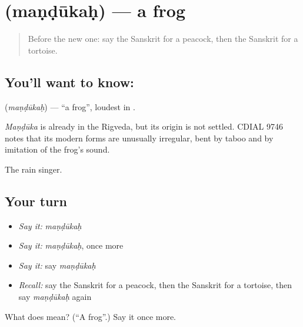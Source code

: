 \section[\texorpdfstring{\sk{मण्डूकः} (maṇḍūkaḥ)}{मण्डूकः (maṇḍūkaḥ)}]{ (maṇḍūkaḥ) — a frog}

\label{lesson:SA-C80-frog}



\begin{quote}
Before the new one: say the Sanskrit for a peacock, then the Sanskrit for a tortoise.
\end{quote}

\subsection*{You'll want to know: }
\textbf{} (\emph{maṇḍūkaḥ}) — \textquotedblleft{}a frog\textquotedblright{}, loudest in \textbf{}.

\begin{cousinweb}
\emph{Maṇḍūka} is already in the Rigveda, but its origin is not settled. CDIAL 9746 notes that its modern forms are unusually irregular, bent by taboo and by imitation of the frog's sound.
\end{cousinweb}

\begin{grammarlens}[title={What you've built}]
The rain singer.
\end{grammarlens}

\subsection*{Your turn}
\begin{itemize}
\raggedright
  \item \emph{Say it:} \emph{maṇḍūkaḥ}
  \item \emph{Say it:} \emph{maṇḍūkaḥ}, once more
  \item \emph{Say it:} say \emph{maṇḍūkaḥ}
  \item \emph{Recall:} say the Sanskrit for a peacock, then the Sanskrit for a tortoise, then say \emph{maṇḍūkaḥ} again
\end{itemize}

\begin{tcolorbox}[breakable,colback=teal!4,colframe=teal!35!black,title={Before you move on}]
What does  mean? (\textquotedblleft{}A frog\textquotedblright{}.) Say it once more.
\end{tcolorbox}
